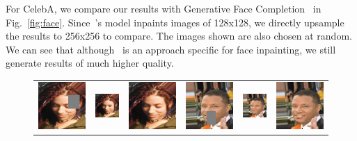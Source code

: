 For CelebA, we compare our results with Generative Face Completion~\cite{li2017generative} in Fig.~\ref{fig:face}. Since~\cite{li2017generative}'s model inpaints images of 128x128, we directly upsample the results to 256x256 to compare. The images shown are also chosen at random. We can see that although~\cite{li2017generative} is an approach specific for face inpainting, we still generate results of much higher quality.

\begin{figure}[h!]
\centering
\small
\begin{tabular}{cccccc}
\includegraphics[width=.16\textwidth]{figures/face/000189_input_image.jpg}&
\includegraphics[width=.16\textwidth]{figures/face/res1/res.jpg}&
\includegraphics[width=.16\textwidth]{figures/face/000189_synthesized_image.jpg}&
\includegraphics[width=.16\textwidth]{figures/face/000194_input_image.jpg}&
\includegraphics[width=.16\textwidth]{figures/face/res2/res.jpg}&
\includegraphics[width=.16\textwidth]{figures/face/000194_synthesized_image.jpg}\\

\end{tabular}
\end{figure}

